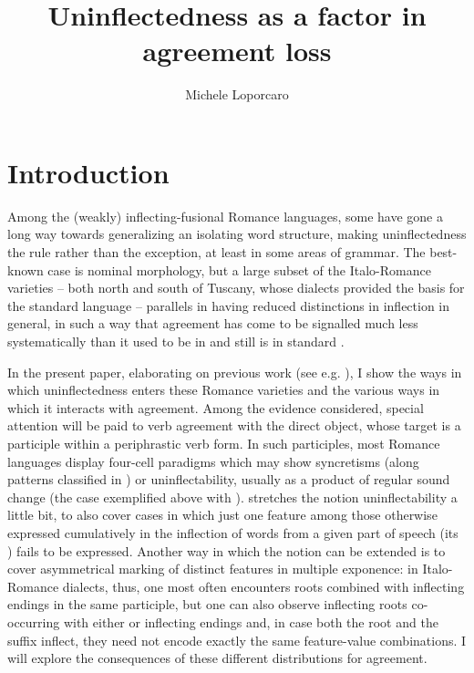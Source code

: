 \documentclass[output=paper,colorlinks,citecolor=brown]{langscibook}
\author{Michele Loporcaro\orcid{}\affiliation{Universität Zürich}}
\title{Uninflectedness as a factor in agreement loss}
\begin{document}
\maketitle

\section{Introduction} \label{04sec1}

Among the (weakly) inflecting-fusional Romance languages, some have gone a long way towards generalizing an isolating word structure, making uninflectedness the rule rather than the exception, at least in some areas of grammar. The best-known case is  nominal morphology, but a large subset of the Italo-Romance varieties -- both north and south of Tuscany, whose dialects provided the basis for the standard language -- parallels  in having reduced distinctions in inflection in general, in such a way that agreement has come to be signalled much less systematically than it used to be in  and still is in standard .

In the present paper, elaborating on previous work (see e.g. \citealt{loporcaro2010-change, loporcaro2015, loporcaropaciaroni2021}), I show the ways in which uninflectedness enters these Romance varieties and the various ways in which it interacts with agreement. Among the evidence considered, special attention will be paid to verb agreement with the direct object, whose target is a participle within a periphrastic verb form. In such participles, most Romance languages display four-cell paradigms which may show syncretisms (along patterns classified in \citealt{loporcaro2011}) or uninflectability, usually as a product of regular sound change (the case exemplified above with ). \citet[143]{spencer2020} stretches the notion uninflectability a little bit, to also cover cases in which just one feature among those otherwise expressed cumulatively in the inflection of words from a given part of speech (its \textit{}) fails to be expressed. Another way in which the notion can be extended is to cover asymmetrical marking of distinct features in multiple exponence: in Italo-Romance dialects, thus, one most often encounters  roots combined with inflecting endings in the same participle, but one can also observe inflecting roots co-occurring with either  or inflecting endings and, in case both the root and the suffix inflect, they need not encode exactly the same feature-value combinations. I will explore the consequences of these different distributions for agreement.
\end{document}
